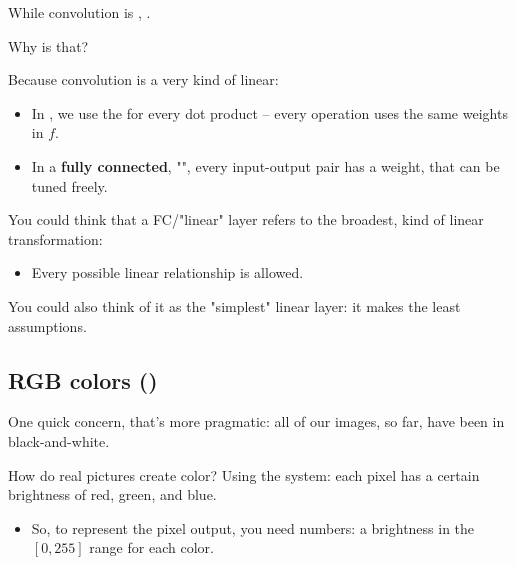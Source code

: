         \begin{clarification}
            While convolution is , .
    
            Why is that?
    
            Because convolution is a very  kind of linear: 
    
            \begin{itemize}
                \item In , we use the  for every dot product -- every operation uses the same weights in $f$.
                \item In a \textbf{fully connected}, "", every input-output pair has a  weight, that can be tuned freely.
            \end{itemize}

            \subsecdiv

            You could think that a FC/"linear" layer refers to the broadest,  kind of linear transformation:

            \begin{itemize}
                \item Every possible linear relationship is allowed.
            \end{itemize}

            You could also think of it as the "simplest" linear layer: it makes the least assumptions.
        \end{clarification}

    \subsection{RGB colors ()}

        One quick concern, that's more pragmatic: all of our images, so far, have been in black-and-white.

        How do real pictures create color? Using the  system: each pixel has a certain brightness of red, green, and blue.

        \begin{itemize}
            \item So, to represent the pixel output, you need  numbers: a brightness in the $[0,255]$ range for each color.
        \end{itemize}

